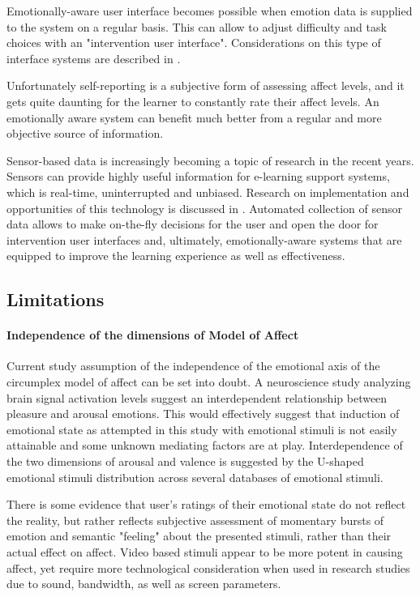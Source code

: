 	Emotionally-aware user interface becomes possible when emotion data is supplied to the system on a regular basis. This can allow to adjust difficulty and task choices with an "intervention user interface". Considerations on this type of interface systems are described in \cite{Schmidt2017}. 
	
	Unfortunately self-reporting is a subjective form of assessing affect levels, and it gets quite daunting for the learner to constantly rate their affect levels. An emotionally aware system can benefit much better from a regular and more objective source of information. 

	Sensor-based data is increasingly becoming a topic of research in the recent years. Sensors can provide highly useful information for e-learning support systems, which is real-time, uninterrupted and unbiased. Research on implementation and opportunities of this technology is discussed in \cite{Yun2016, Brovkov2017}. Automated collection of sensor data allows to make on-the-fly decisions for the user and open the door for intervention user interfaces and, ultimately, emotionally-aware systems that are equipped to improve the learning experience as well as effectiveness.
	
	\subsection{Limitations}
	
	\paragraph{Independence of the dimensions of Model of Affect}
	
	Current study assumption of the independence of the emotional axis of the circumplex model of affect can be set into doubt. A neuroscience study \cite{Bestelmeyer2017} analyzing brain signal activation levels suggest an interdependent relationship between pleasure and arousal emotions. 
	This would effectively suggest that induction of emotional state as attempted in this study with emotional stimuli is not easily attainable and some unknown mediating factors are at play. Interdependence of the two dimensions of arousal and valence is suggested by the U-shaped emotional stimuli distribution across several databases of emotional stimuli. 
	
	There is some evidence that user's ratings of their emotional state do not reflect the reality, but rather reflects subjective assessment of momentary bursts of emotion and semantic "feeling" about the presented stimuli, rather than their actual effect on affect. Video based stimuli appear to be more potent in causing affect, yet require more technological consideration when used in research studies due to sound, bandwidth, as well as screen parameters.
	
